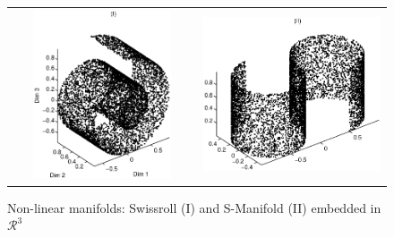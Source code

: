 \documentclass{article} %
\begin{document}
\begin{figure}
\centering
\begin{tabular}{cc}
\includegraphics[width=60mm,height=50mm]{Swissroll.eps} & \includegraphics[width=60mm,height=50mm]{SManifold.eps}
\end{tabular}
\caption{Non-linear manifolds: Swissroll (I) and S-Manifold (II) embedded in $\mathcal{R}^3$} \label{manifold:nonlinear}
\end{figure}



 
 
\end{document}

